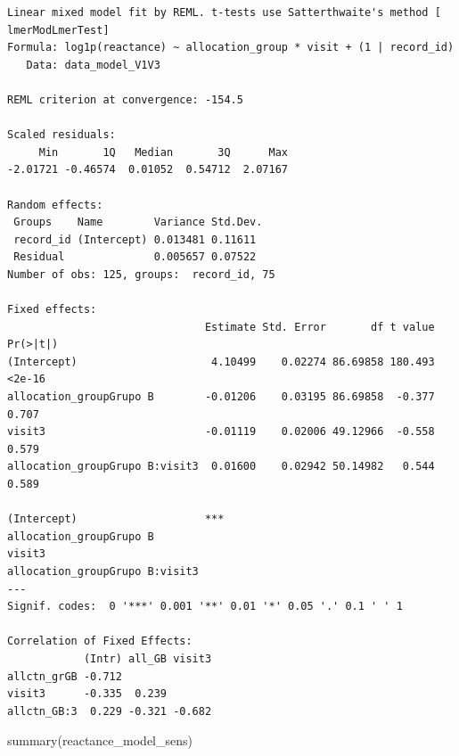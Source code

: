 \documentclass[
  letterpaper,
  DIV=11,
  numbers=noendperiod]{scrartcl}
\newenvironment{Shaded}{\begin{snugshade}}{\end{snugshade}}
\newcommand{\FunctionTok}[1]{\textcolor[rgb]{0.28,0.35,0.67}{#1}}
\newcommand{\NormalTok}[1]{\textcolor[rgb]{0.00,0.23,0.31}{#1}}
\begin{document}
\begin{verbatim}
Linear mixed model fit by REML. t-tests use Satterthwaite's method [
lmerModLmerTest]
Formula: log1p(reactance) ~ allocation_group * visit + (1 | record_id)
   Data: data_model_V1V3

REML criterion at convergence: -154.5

Scaled residuals: 
     Min       1Q   Median       3Q      Max 
-2.01721 -0.46574  0.01052  0.54712  2.07167 

Random effects:
 Groups    Name        Variance Std.Dev.
 record_id (Intercept) 0.013481 0.11611 
 Residual              0.005657 0.07522 
Number of obs: 125, groups:  record_id, 75

Fixed effects:
                               Estimate Std. Error       df t value Pr(>|t|)
(Intercept)                     4.10499    0.02274 86.69858 180.493   <2e-16
allocation_groupGrupo B        -0.01206    0.03195 86.69858  -0.377    0.707
visit3                         -0.01119    0.02006 49.12966  -0.558    0.579
allocation_groupGrupo B:visit3  0.01600    0.02942 50.14982   0.544    0.589
                                  
(Intercept)                    ***
allocation_groupGrupo B           
visit3                            
allocation_groupGrupo B:visit3    
---
Signif. codes:  0 '***' 0.001 '**' 0.01 '*' 0.05 '.' 0.1 ' ' 1

Correlation of Fixed Effects:
            (Intr) all_GB visit3
allctn_grGB -0.712              
visit3      -0.335  0.239       
allctn_GB:3  0.229 -0.321 -0.682
\end{verbatim}

\begin{Shaded}
\begin{Highlighting}[]
\FunctionTok{summary}\NormalTok{(reactance\_model\_sens)}
\end{Highlighting}
\end{Shaded}
\end{document}
